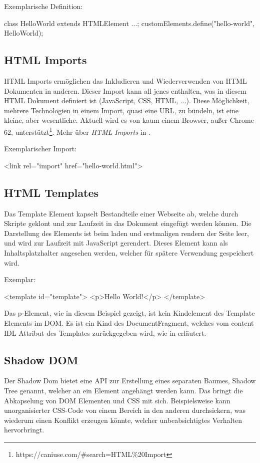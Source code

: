 Exemplarische Definition:
\begin{JsCode}
	class HelloWorld extends HTMLElement {...};
	customElements.define("hello-world", HelloWorld);
\end{JsCode}

\subsection{HTML Imports}
HTML Imports ermöglichen das Inkludieren und Wiederverwenden von HTML Dokumenten in anderen. Dieser Import kann all jenes enthalten, was in diesem HTML Dokument definiert ist (JavaScript, CSS, HTML, ...). 
Diese Möglichkeit, mehrere Technologien in einem Import, quasi eine URL, zu bündeln, ist eine kleine, aber wesentliche. Aktuell wird es von kaum einem Browser, außer Chrome 62,  unterstützt\footnote{https://caniuse.com/\#search=HTML\%20Import}. Mehr über \emph{HTML Imports} in \cite{html-imports}.

Exemplarischer Import:
\begin{JsCode}
	<link rel="import" href="hello-world.html">
\end{JsCode}

\subsection{HTML Templates}
Das Template Element kapselt Bestandteile einer Webseite ab, welche durch Skripte geklont und zur Laufzeit in das Dokument eingefügt werden können. Die Darstellung des Elements ist beim laden und erstmaligen rendern der Seite leer, und wird zur Laufzeit mit JavaScript gerendert. Dieses Element kann als Inhaltsplatzhalter angesehen werden, welcher für spätere Verwendung gespeichert wird. 

Exemplar:
\begin{JsCode}
<template id="template">
	<p>Hello World!</p>
</template>
\end{JsCode}
Das p-Element, wie in diesem Beispiel gezeigt, ist kein Kindelement des Template Elements im DOM. Es ist ein Kind des DocumentFragment, welches vom content IDL Attribut des Templates zurückgegeben wird, wie in \cite{html-templates} erläutert.

\subsection{Shadow DOM}
Der Shadow Dom bietet eine API zur Erstellung eines separaten Baumes, Shadow Tree genannt, welcher an ein Element angehängt werden kann.
Das bringt die Abkapselung von DOM Elementen und CSS mit sich. Beispielsweise kann unorganisierter CSS-Code von einem Bereich in den anderen durchsickern, was wiederum einen Konflikt erzeugen könnte, welcher unbeabsichtigtes Verhalten hervorbringt. 

